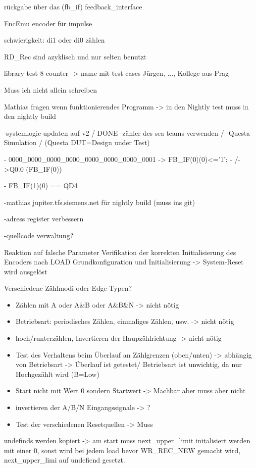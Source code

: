 rückgabe über das (fb\_if) feedback\_interface

EncEmu encoder für impulse 

schwierigkeit: di1 oder di0 zählen

RD\_Rec sind azyklisch und nur selten benutzt

library test 8 counter -> name mit test cases Jürgen, ..., Kollege aus Prag

Muss ich nicht allein schreiben

Mathias fragen wenn funktionierendes Programm -> in den Nightly test muss in den nightly build

-systemlogic updaten auf v2 / DONE 
-zähler des sea teams verwenden /
-Questa Simulation /
(Questa DUT=Design under Test)

- 0000\_0000\_0000\_0000\_0000\_0000\_0000\_0001 -> FB\_IF(0)(0)<='1';
-    /->Q0.0                          (FB\_IF(0))

- FB\_IF(1)(0) == QD4

-mathias jupiter.tfs.siemens.net für nightly build (muss ins git)

-adress register verbessern

-quellcode verwaltung?


Reaktion auf falsche Parameter
Verifikation der korrekten Initialisierung des Encoders nach LOAD
Grundkonfiguration und Initialisierung -> System-Reset wird ausgelöst

Verschiedene Zählmodi oder Edge-Typen?

\begin{itemize}
    \item Zählen mit A oder A\&B oder A\&B\&N -> nicht nötig
    \item Betriebsart: periodisches Zählen, einmaliges Zählen, usw. -> nicht nötig
    \item hoch/runterzählen, Invertieren der Haupzählrichtung -> nicht nötig
    \item Test des Verhaltens beim Überlauf an Zählgrenzen (oben/unten) -> abhängig von Betriebsart -> Überlauf ist getestet/ Betriebsart ist unwichtig, da nur Hochgezählt wird (B=Low)
    \item Start nicht mit Wert 0 sondern Startwert -> Machbar aber muss aber nicht
    \item invertieren der A/B/N Eingangssignale -> ?
    \item Test der verschiedenen Resetquellen -> Muss
\end{itemize}

undefinds werden kopiert -> am start muss next\_upper\_limit initalisiert werden mit einer 0, sonst wird bei jedem load bevor WR\_REC\_NEW gemacht wird, next\_upper\_limi auf undefiend gesetzt.

